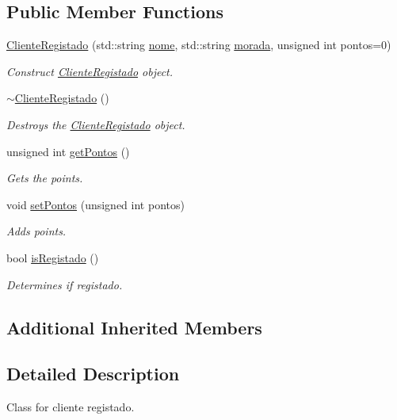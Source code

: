 \subsection*{Public Member Functions}
\begin{DoxyCompactItemize}
\item 
\hyperlink{classClienteRegistado_a1e5fb2a3b8da315636e9f0bb98dd9c9e}{Cliente\+Registado} (std\+::string \hyperlink{classCliente_aaa79b0a26f7d5d007fe4ae9696564ca5}{nome}, std\+::string \hyperlink{classCliente_a24ba6895be9bdf5112e9e67a34d13704}{morada}, unsigned int pontos=0)
\begin{DoxyCompactList}\small\item\em Construct \hyperlink{classClienteRegistado}{Cliente\+Registado} object. \end{DoxyCompactList}\item 
\hyperlink{classClienteRegistado_aedd23edfd615aa1a0355951cdd7e94c6}{$\sim$\+Cliente\+Registado} ()
\begin{DoxyCompactList}\small\item\em Destroys the \hyperlink{classClienteRegistado}{Cliente\+Registado} object. \end{DoxyCompactList}\item 
unsigned int \hyperlink{classClienteRegistado_a0118e31f16e4dce542f5e1d124d26c61}{get\+Pontos} ()
\begin{DoxyCompactList}\small\item\em Gets the points. \end{DoxyCompactList}\item 
void \hyperlink{classClienteRegistado_a93d79ba4ecd6716124c832fc2f38ddc5}{set\+Pontos} (unsigned int pontos)
\begin{DoxyCompactList}\small\item\em Adds points. \end{DoxyCompactList}\item 
bool \hyperlink{classClienteRegistado_a3dade20423acb0e84c9fbe30c75f0e3e}{is\+Registado} ()
\begin{DoxyCompactList}\small\item\em Determines if registado. \end{DoxyCompactList}\end{DoxyCompactItemize}
\subsection*{Additional Inherited Members}


\subsection{Detailed Description}
Class for cliente registado. 

